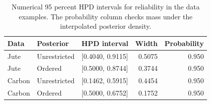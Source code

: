 \begin{table}[htbp]
\centering
\caption{Numerical 95 percent HPD intervals for reliability in the data examples. The probability column checks mass under the interpolated posterior density.}\label{tab:real-hpd}
\small
\begin{tabular}{lllrr}
\toprule
Data & Posterior & HPD interval & Width & Probability \\
\midrule
Jute & Unrestricted & [0.4040, 0.9115] & 0.5075 & 0.950 \\
Jute & Ordered & [0.5000, 0.8744] & 0.3744 & 0.950 \\
Carbon & Unrestricted & [0.1462, 0.5915] & 0.4454 & 0.950 \\
Carbon & Ordered & [0.5000, 0.6752] & 0.1752 & 0.950 \\
\bottomrule
\end{tabular}
\end{table}
